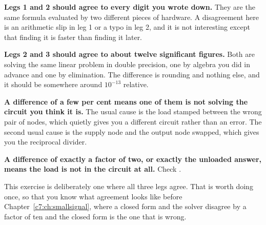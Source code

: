 \textbf{Legs 1 and 2 should agree to every digit you wrote down.} They are the same formula evaluated by two different pieces of hardware. A disagreement here is an arithmetic slip in leg 1 or a typo in leg 2, and it is not interesting except that finding it is faster than finding it later.

\textbf{Legs 2 and 3 should agree to about twelve significant figures.} Both are solving the same linear problem in double precision, one by algebra you did in advance and one by elimination. The difference is rounding and nothing else, and it should be somewhere around $10^{-13}$ relative.

\textbf{A difference of a few per cent means one of them is not solving the circuit you think it is.} The usual cause is the load stamped between the wrong pair of nodes, which quietly gives you a different circuit rather than an error. The second usual cause is the supply node and the output node swapped, which gives you the reciprocal divider.

\textbf{A difference of exactly a factor of two, or exactly the unloaded answer, means the load is not in the circuit at all.} Check .

This exercise is deliberately one where all three legs agree. That is worth doing once, so that you know what agreement looks like before Chapter~\ref{c7:ch:smallsignal}, where a closed form and the solver disagree by a factor of ten and the closed form is the one that is wrong.
